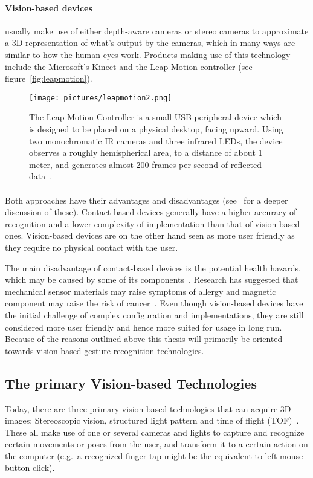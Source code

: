 \paragraph{Vision-based devices} usually make use of either depth-aware cameras or stereo cameras to approximate a 3D representation of what's output by the cameras, 
which in many ways are similar to how the human eyes work. 
Products making use of this technology include the Microsoft's Kinect and the Leap Motion controller (see figure~\vref{fig:leapmotion}). 

\begin{figure}%
	\texttt{[image: pictures/leapmotion2.png]}
	\caption[The Leap Motion Controller]{The Leap Motion Controller is a small USB peripheral device which is designed to be placed on a physical desktop, 
	facing upward. Using two monochromatic IR cameras and three infrared LEDs, the device observes a roughly hemispherical area, to a distance of about 1 meter, 
	and generates almost 200 frames per second of reflected data~\citep{LeapMotion2016}.}
	\label{fig:leapmotion}
\end{figure} 

\paragraph{}Both approaches have their advantages and disadvantages (see~\citet{Rautaray2015} for a deeper discussion of these). 
Contact-based devices generally have a higher accuracy of recognition and a lower complexity of implementation than that of vision-based ones. 
Vision-based devices are on the other hand seen as more user friendly as they require no physical contact with the user. 

The main disadvantage of contact-based devices is the potential health hazards, which may be caused by some of its components~\citep{Schultz2003}. 
Research has suggested that mechanical sensor materials may raise symptoms of allergy and magnetic component may raise the risk of cancer~\citep{Nishikawa2003}. 
Even though vision-based devices have the initial challenge of complex configuration and implementations, 
they are still considered more user friendly and hence more suited for usage in long run. Because of the reasons outlined above this thesis will primarily 
be oriented towards vision-based gesture recognition technologies. 

\subsection{The primary Vision-based Technologies}
Today, there are three primary vision-based technologies that can acquire 3D images: Stereoscopic vision, structured light pattern and time of flight (TOF)~\citep{Ko2012}.
These all make use of one or several cameras and lights to capture and recognize certain movements or poses from the user, 
and transform it to a certain action on the computer (e.g.~a recognized finger tap might be the equivalent to left mouse button click). 


